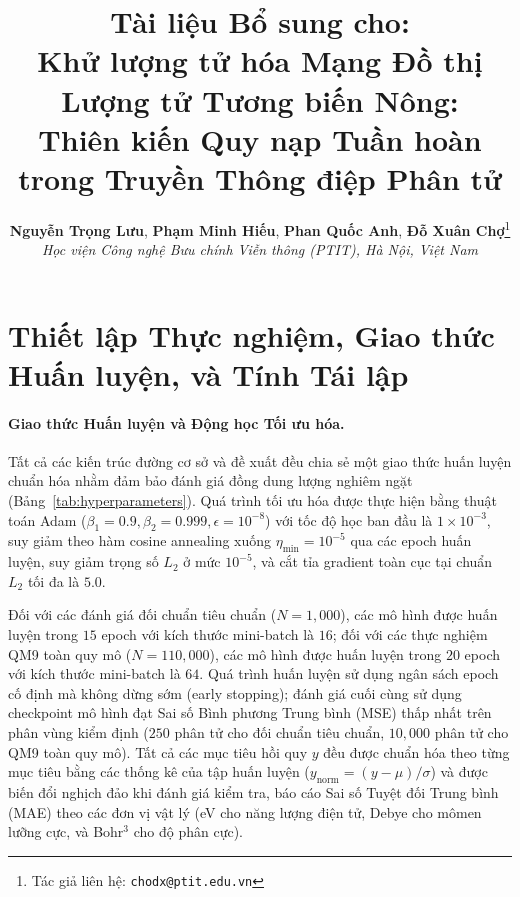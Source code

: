 \documentclass[10pt,twocolumn,letterpaper]{article}
\title{\textbf{Tài liệu Bổ sung cho:\\Khử lượng tử hóa Mạng Đồ thị Lượng tử Tương biến Nông:\\Thiên kiến Quy nạp Tuần hoàn trong Truyền Thông điệp Phân tử}}
\author{
    \textbf{Nguyễn Trọng Lưu}, \textbf{Phạm Minh Hiếu}, \textbf{Phan Quốc Anh}, \textbf{Đỗ Xuân Chợ}\thanks{Tác giả liên hệ: \texttt{chodx@ptit.edu.vn}} \\
    \textit{Học viện Công nghệ Bưu chính Viễn thông (PTIT), Hà Nội, Việt Nam}
}
\date{}
\begin{document}
\maketitle

\setcounter{section}{0}
\renewcommand{\thesection}{SM \Alph{section}}
\renewcommand{\thefigure}{S\arabic{figure}}
\renewcommand{\thetable}{S\arabic{table}}

\section{Thiết lập Thực nghiệm, Giao thức Huấn luyện, và Tính Tái lập}
\label{sec:sm_hyperparameters}
\label{sm:setup}



\paragraph{Giao thức Huấn luyện và Động học Tối ưu hóa.}
Tất cả các kiến trúc đường cơ sở và đề xuất đều chia sẻ một giao thức huấn luyện chuẩn hóa nhằm đảm bảo đánh giá đồng dung lượng nghiêm ngặt (Bảng~\ref{tab:hyperparameters}). Quá trình tối ưu hóa được thực hiện bằng thuật toán Adam ($\beta_1 = 0.9, \beta_2 = 0.999, \epsilon = 10^{-8}$) với tốc độ học ban đầu là $1 \times 10^{-3}$, suy giảm theo hàm cosine annealing xuống $\eta_{\mathrm{min}} = 10^{-5}$ qua các epoch huấn luyện, suy giảm trọng số $L_2$ ở mức $10^{-5}$, và cắt tỉa gradient toàn cục tại chuẩn $L_2$ tối đa là $5.0$.

Đối với các đánh giá đối chuẩn tiêu chuẩn ($N = 1{,}000$), các mô hình được huấn luyện trong $15$ epoch với kích thước mini-batch là $16$; đối với các thực nghiệm QM9 toàn quy mô ($N = 110{,}000$), các mô hình được huấn luyện trong $20$ epoch với kích thước mini-batch là $64$. Quá trình huấn luyện sử dụng ngân sách epoch cố định mà không dừng sớm (early stopping); đánh giá cuối cùng sử dụng checkpoint mô hình đạt Sai số Bình phương Trung bình (MSE) thấp nhất trên phân vùng kiểm định ($250$ phân tử cho đối chuẩn tiêu chuẩn, $10{,}000$ phân tử cho QM9 toàn quy mô). Tất cả các mục tiêu hồi quy $y$ đều được chuẩn hóa theo từng mục tiêu bằng các thống kê của tập huấn luyện ($y_{\mathrm{norm}} = (y - \mu)/\sigma$) và được biến đổi nghịch đảo khi đánh giá kiểm tra, báo cáo Sai số Tuyệt đối Trung bình (MAE) theo các đơn vị vật lý (eV cho năng lượng điện tử, Debye cho mômen lưỡng cực, và Bohr$^3$ cho độ phân cực).
\end{document}
